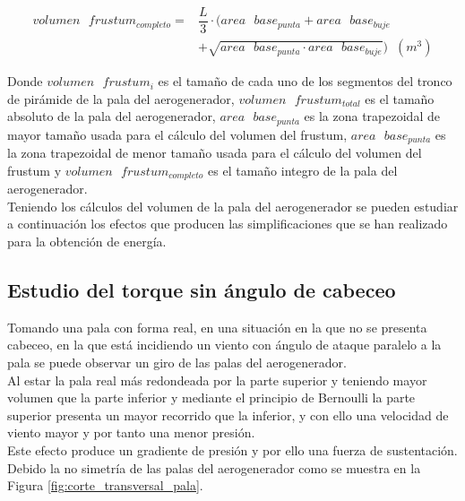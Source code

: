  \begin{equation}
    \begin{split}
        volumen \text{ } frustum_{completo} = & \dfrac{L}{3} \cdot ( area \text{ } base_{punta} + area \text{ }  base_{buje}\\
        & + \sqrt{area \text{ } base_{punta} \cdot area \text{ } base_{buje}}) \hspace{7pt} (m^3) 
    \end{split}
 \end{equation}

Donde $ volumen \text{ } frustum_i $ es el tamaño de cada uno de los segmentos del tronco de pirámide de la pala del aerogenerador, $ volumen \text{ } frustum_{total} $ es el tamaño absoluto de la pala del aerogenerador, $area \text{ } base_{punta}$ es la zona trapezoidal de mayor tamaño usada para el cálculo del volumen del frustum, $area \text{ } base_{punta}$ es la zona trapezoidal de menor tamaño usada para el cálculo del volumen del frustum y $ volumen \text{ } frustum_{completo} $ es el tamaño integro de la pala del aerogenerador.\\


Teniendo los cálculos del volumen de la pala del aerogenerador se pueden estudiar a continuación los efectos que producen las simplificaciones que se han realizado para la obtención de energía.


\subsection{Estudio del torque sin ángulo de cabeceo}
\label{section:no_cabeceo}

Tomando una pala con forma real, en una situación en la que no se presenta cabeceo, en la que está incidiendo un viento con ángulo de ataque paralelo a la pala se puede observar un giro de las palas del aerogenerador.\\

Al estar la pala real más redondeada por la parte superior y teniendo mayor volumen que la parte inferior y mediante el principio de Bernoulli la parte superior presenta un mayor recorrido que la inferior, y con ello una velocidad de viento mayor y por tanto una menor presión. \\

Este efecto produce un gradiente de presión y por ello una fuerza de sustentación. Debido la no simetría de las palas del aerogenerador como se muestra en la Figura \ref{fig:corte_transversal_pala}. \\

